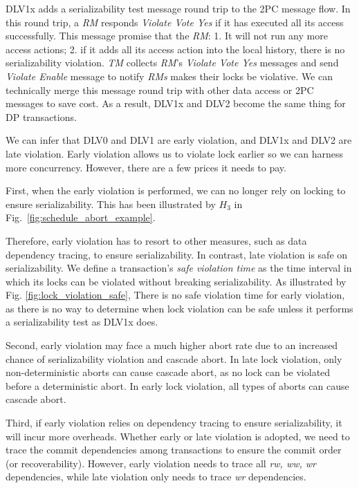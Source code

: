 \documentclass[conference]{IEEEtran}
\begin{document}
\begin{highlighted}
DLV1x adds a serializability test message round trip to the 2PC message flow.
In this round trip, a \emph{RM} responds \emph{Violate Vote Yes} if it has executed all its access successfully.
This message promise that the \emph{RM}: 1. It will not run any more access actions; 2. if it adds all its access action into the local history, there is no serializability violation.
\emph{TM} collects \emph{RM}'s \emph{Violate Vote Yes} messages and send \emph{Violate Enable} message to notify \emph{RMs} makes their locks be violative.
We can technically merge this message round trip with other data access or 2PC messages to save cost.
As a result, DLV1x and DLV2 become the same thing for DP transactions.


We can infer that DLV0 and DLV1 are early violation, and DLV1x and DLV2 are  late violation.
Early violation allows us to violate lock earlier so we can harness more concurrency. However, there are a few prices it needs to pay.

First, when the early violation is performed, we can no longer rely on locking to ensure serializability. This has been illustrated by ${H_3}$ in Fig.~\ref{fig:schedule_abort_example}.

Therefore, early violation has to resort to other measures, such as data dependency tracing, to ensure serializability.
In contrast, late violation is safe on serializability.
We define a transaction's \emph{safe violation time} as the time interval in which its locks can be violated without breaking serializability.
As illustrated by Fig. \ref{fig:lock_violation_safe},
There is no safe violation time for early violation, as there is no way to determine when lock violation can be safe unless it performs a serializability test as DLV1x does.

Second, early violation may face a much higher abort rate due to an increased chance of serializability violation and cascade abort.
In late lock violation, only non-deterministic aborts can cause cascade abort, as no lock can be violated before a deterministic abort.
In early lock violation, all types of aborts can cause cascade abort.

Third, if early violation relies on dependency tracing to ensure serializability, it will incur more overheads.
Whether early or late violation is adopted, we need to trace the commit dependencies among transactions to ensure the commit order (or recoverability).
However, early violation needs to trace all \emph{rw, ww, wr} dependencies, while late violation only needs to trace \emph{wr} dependencies.

\end{highlighted}
\end{document}
